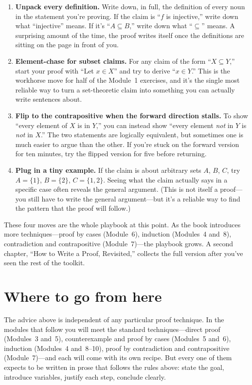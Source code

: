 \documentclass[11pt]{article}
\begin{document}
\begin{enumerate}
  \item \textbf{Unpack every definition.} Write down, in full, the definition of every noun in the statement you're proving. If the claim is ``$f$ is injective,'' write down what ``injective'' means. If it's ``$A \subseteq B$,'' write down what ``$\subseteq$'' means. A surprising amount of the time, the proof writes itself once the definitions are sitting on the page in front of you.
  \item \textbf{Element-chase for subset claims.} For any claim of the form ``$X \subseteq Y$,'' start your proof with ``Let $x \in X$'' and try to derive ``$x \in Y$.'' This is the workhorse move for half of the Module~1 exercises, and it's the single most reliable way to turn a set-theoretic claim into something you can actually write sentences about.
  \item \textbf{Flip to the contrapositive when the forward direction stalls.} To show ``every element of $X$ is in $Y$,'' you can instead show ``every element \emph{not} in $Y$ is \emph{not} in $X$.'' The two statements are logically equivalent, but sometimes one is much easier to argue than the other. If you're stuck on the forward version for ten minutes, try the flipped version for five before returning.
  \item \textbf{Plug in a tiny example.} If the claim is about arbitrary sets $A$, $B$, $C$, try $A = \{1\}$, $B = \{2\}$, $C = \{1, 2\}$. Seeing what the claim actually says in a specific case often reveals the general argument. (This is not itself a proof---you still have to write the general argument---but it's a reliable way to find the pattern that the proof will follow.)
\end{enumerate}

These four moves are the whole playbook at this point. As the book introduces more techniques---proof by cases (Module~6), induction (Modules~4 and~8), contradiction and contrapositive (Module~7)---the playbook grows. A second chapter, ``How to Write a Proof, Revisited,'' collects the full version after you've seen the rest of the toolkit.

\section{Where to go from here}

The advice above is independent of any particular proof technique. In the modules that follow you will meet the standard techniques---direct proof (Modules~3 and~5), counterexample and proof by cases (Modules~5 and~6), induction (Modules~4 and~8--10), proof by contradiction and contrapositive (Module~7)---and each will come with its own recipe. But every one of them expects to be written in prose that follows the rules above: state the goal, introduce variables, justify each step, conclude clearly.
\end{document}
